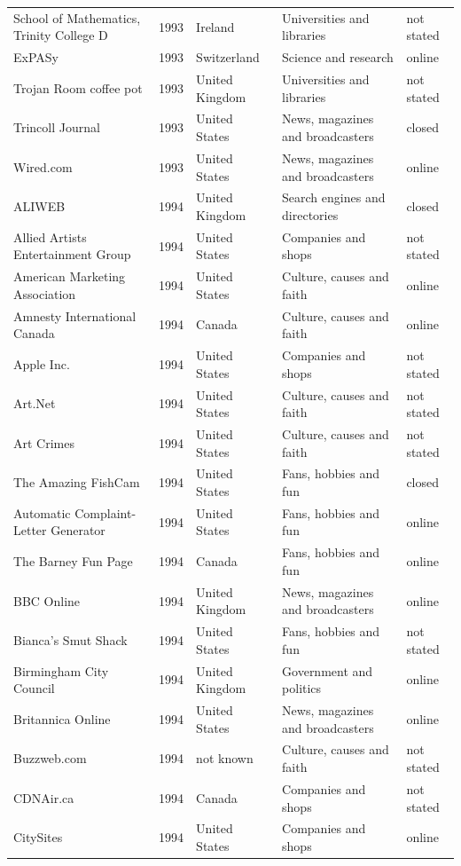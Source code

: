 \documentclass[11pt,a4paper]{article}
\begin{document}
\begin{footnotesize}
\begin{longtable}{p{4.6cm}rp{2.8cm}p{4.3cm}l}
School of Mathematics, Trinity College D & 1993 & Ireland & Universities and libraries & not stated\\
ExPASy & 1993 & Switzerland & Science and research & online\\
Trojan Room coffee pot & 1993 & United Kingdom & Universities and libraries & not stated\\
Trincoll Journal & 1993 & United States & News, magazines and broadcasters & closed\\
Wired.com & 1993 & United States & News, magazines and broadcasters & online\\
ALIWEB & 1994 & United Kingdom & Search engines and directories & closed\\
Allied Artists Entertainment Group & 1994 & United States & Companies and shops & not stated\\
American Marketing Association & 1994 & United States & Culture, causes and faith & online\\
Amnesty International Canada & 1994 & Canada & Culture, causes and faith & online\\
Apple Inc. & 1994 & United States & Companies and shops & not stated\\
Art.Net & 1994 & United States & Culture, causes and faith & not stated\\
Art Crimes & 1994 & United States & Culture, causes and faith & not stated\\
The Amazing FishCam & 1994 & United States & Fans, hobbies and fun & closed\\
Automatic Complaint-Letter Generator & 1994 & United States & Fans, hobbies and fun & online\\
The Barney Fun Page & 1994 & Canada & Fans, hobbies and fun & online\\
BBC Online & 1994 & United Kingdom & News, magazines and broadcasters & online\\
Bianca's Smut Shack & 1994 & United States & Fans, hobbies and fun & not stated\\
Birmingham City Council & 1994 & United Kingdom & Government and politics & online\\
Britannica Online & 1994 & United States & News, magazines and broadcasters & online\\
Buzzweb.com & 1994 & not known & Culture, causes and faith & not stated\\
CDNAir.ca & 1994 & Canada & Companies and shops & not stated\\
CitySites & 1994 & United States & Companies and shops & online\\

\end{longtable}
\end{footnotesize}
\end{document}
